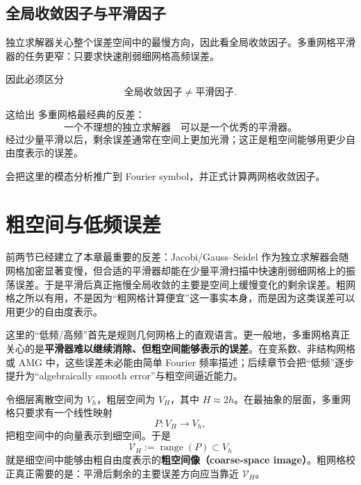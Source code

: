 \subsection{全局收敛因子与平滑因子}

独立求解器关心整个误差空间中的最慢方向，因此看全局收敛因子。多重网格平滑器的任务更窄：只要求快速削弱细网格高频误差。

因此必须区分
\begin{equation}
\boxed{
\text{全局收敛因子}
\neq
\text{平滑因子}.
}
\end{equation}

这给出 多重网格最经典的反差：
\begin{equation}
\boxed{
\text{一个不理想的独立求解器}
\quad
\text{可以是一个优秀的平滑器。}
}
\end{equation}
经过少量平滑以后，剩余误差通常在空间上更加光滑；这正是粗空间能够用更少自由度表示的误差。

会把这里的模态分析推广到 Fourier symbol，并正式计算两网格收敛因子。

\section{粗空间与低频误差}

前两节已经建立了本章最重要的反差：Jacobi/Gauss--Seidel 作为独立求解器会随网格加密显著变慢，但合适的平滑器却能在少量平滑扫描中快速削弱细网格上的振荡误差。于是平滑后真正拖慢全局收敛的主要是空间上缓慢变化的剩余误差。粗网格之所以有用，不是因为“粗网格计算便宜”这一事实本身，而是因为这类误差可以用更少的自由度表示。

这里的“低频/高频”首先是规则几何网格上的直观语言。更一般地，多重网格真正关心的是\textbf{平滑器难以继续消除、但粗空间能够表示的误差}。在变系数、非结构网格或 AMG 中，这些误差未必能由简单 Fourier 频率描述；后续章节会把“低频”逐步提升为“algebraically smooth error”与粗空间逼近能力。

令细层离散空间为 $V_h$，粗层空间为 $V_H$，其中 $H\approx2h$。在最抽象的层面，多重网格只要求有一个线性映射
\begin{equation}
P:V_H\rightarrow V_h,
\label{eq:twogrid-prolongation-map}
\end{equation}
把粗空间中的向量表示到细空间。于是
\begin{equation}
\mathcal V_H:=\operatorname{range}(P)\subset V_h
\label{eq:twogrid-coarse-subspace}
\end{equation}
就是细空间中能够由粗自由度表示的\textbf{粗空间像（coarse-space image）}。粗网格校正真正需要的是：平滑后剩余的主要误差方向应当靠近 $\mathcal V_H$。


